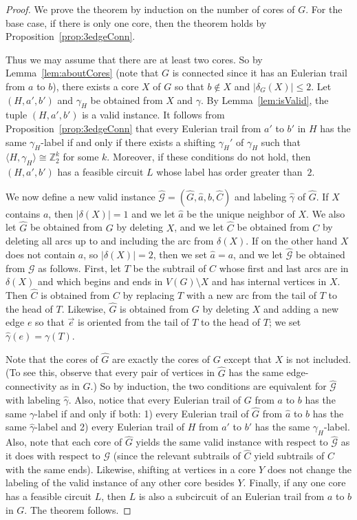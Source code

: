 \documentclass[a4paper, 12pt]{article}
\let\leq\leqslant
\begin{document}
\begin{proof}
    We prove the theorem by induction on the number of cores of $G$. For the base case, if there is only one core, then the theorem holds by Proposition~\ref{prop:3edgeConn}.

    Thus we may assume that there are at least two cores. So by Lemma~\ref{lem:aboutCores} (note that $G$ is connected since it has an Eulerian trail from $a$ to $b$), there exists a core $X$ of $G$ so that $b \notin X$ and $|\delta_G(X)|\leq 2$. Let $(H, a', b')$ and $\gamma_H$ be obtained from $X$ and $\gamma$. By Lemma~\ref{lem:isValid}, the tuple $(H, a', b')$ is a valid instance. It follows from Proposition~\ref{prop:3edgeConn} that every Eulerian trail from $a'$ to $b'$ in $H$ has the same $\gamma_H$-label if and only if there exists a shifting $\gamma_H'$ of $\gamma_H$ such that $\langle H, \gamma_H\rangle \cong \mathbb{Z}_2^k$ for some $k$. Moreover, if these conditions do not hold, then $(H, a', b')$ has a feasible circuit $L$ whose label has order greater than~$2$.
    
    We now define a new valid instance $\hat{\mathcal{G}}=(\hat{G}, \hat{a}, b, \hat{C})$ and labeling $\hat{\gamma}$ of $\hat{G}$. If $X$ contains $a$, then $|\delta(X)|=1$ and we let $\hat{a}$ be the unique neighbor of $X$. We also let $\hat{G}$ be obtained from $G$ by deleting $X$, and we let $\hat{C}$ be obtained from $C$ by deleting all arcs up to and including the arc from $\delta(X)$. If on the other hand $X$ does not contain $a$, so $|\delta(X)| = 2$, then we set $\hat{a}=a$, and we let $\hat{\mathcal{G}}$ be obtained from $\mathcal{G}$ as follows. First, let $T$ be the subtrail of $C$ whose first and last arcs are in $\delta(X)$ and which begins and ends in $V(G)\setminus X$ and has internal vertices in $X$. Then $\hat{C}$ is obtained from $C$ by replacing $T$ with a new arc from the tail of $T$ to the head of $T$. Likewise, $\hat{G}$ is obtained from $G$ by deleting $X$ and adding a new edge $e$ so that $\vec{e}$ is oriented from the tail of $T$ to the head of $T$; we set $\hat{\gamma}(e)=\gamma(T)$.

    Note that the cores of $\hat{G}$ are exactly the cores of $G$ except that $X$ is not included. (To see this, observe that every pair of vertices in $\hat{G}$ has the same edge-connectivity as in $G$.) So by induction, the two conditions are equivalent for $\hat{\mathcal{G}}$ with labeling $\hat{\gamma}$. Also, notice that every Eulerian trail of $G$ from $a$ to $b$ has the same $\gamma$-label if and only if both: 1) every Eulerian trail of $\hat{G}$ from $\hat{a}$ to $b$ has the same $\hat{\gamma}$-label and 2) every Eulerian trail of $H$ from $a'$ to $b'$ has the same $\gamma_H$-label. Also, note that each core of $\hat{G}$ yields the same valid instance with respect to $\hat{\mathcal{G}}$ as it does with respect to $\mathcal{G}$ (since the relevant subtrails of $\hat{C}$ yield subtrails of $C$ with the same ends). Likewise, shifting at vertices in a core $Y$ does not change the labeling of the valid instance of any other core besides $Y$. Finally, if any one core has a feasible circuit $L$, then $L$ is also a subcircuit of an Eulerian trail from $a$ to $b$ in $G$. The theorem follows.
\end{proof}
\end{document}
